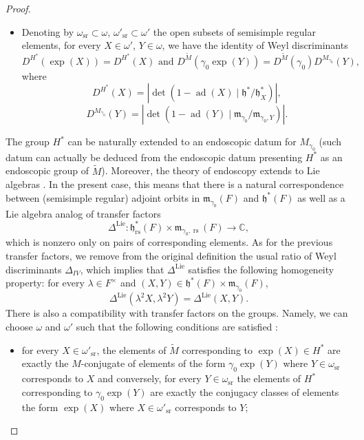 \documentclass[12pt]{article}
\numberwithin{equation}{section}
\def\tM{\widetilde{M}}
\DeclareMathOperator{\ad}{ad}
\DeclareMathOperator{\Lie}{Lie}
\DeclareMathOperator{\rs}{rs}
\DeclareMathOperator{\sr}{sr}
\begin{document}
\begin{proof}
\begin{itemize}
			\item Denoting by $\omega_{\sr}\subset \omega$, $\omega'_{\sr}\subset \omega'$ the open subsets of semisimple regular elements, for every $X\in \omega'$, $Y\in \omega$, we have the identity of Weyl discriminants
			\begin{equation}\label{eq Weyl disc}
				\displaystyle D^{H^*}(\exp(X))=D^{H^*}(X) \mbox{ and } D^{\tM}(\gamma_0 \exp(Y))=D^{\tM}(\gamma_0) D^{M_{\gamma_0}}(Y),
			\end{equation}
			where
		$$\displaystyle D^{H^*}(X)=\left\lvert \det(1-\ad(X)\mid \mathfrak{h}^*/\mathfrak{h}^*_X)\right\rvert,$$
		$$\displaystyle D^{M_{\gamma_0}}(Y)=\left\lvert \det(1-\ad(Y)\mid \mathfrak{m}_{\gamma_0}/\mathfrak{m}_{\gamma_0,Y})\right\rvert.$$
		\end{itemize}
		
		The group $H^*$ can be naturally extended to an endoscopic datum for $M_{\gamma_0}$ (such datum can actually be deduced from the endoscopic datum presenting $H^*$ as an endoscopic group of $\tM$). Moreover, the theory of endoscopy extends to Lie algebras \cite[\S 2]{WaldLFimptrans}. In the present case, this means that there is a natural correspondence between (semisimple regular) adjoint orbits in $\mathfrak{m}_{\gamma_0}(F)$ and $\mathfrak{h}^*(F)$ as well as a Lie algebra analog of transfer factors
		$$\displaystyle \Delta^{\Lie}: \mathfrak{h}^*_{\rs}(F)\times \mathfrak{m}_{\gamma_0,\rs}(F)\to \mathbb{C},$$
		which is nonzero only on pairs of corresponding elements. As for the previous transfer factors, we remove from the original definition the usual ratio of Weyl discriminants $\Delta_{IV}$, which implies that $\Delta^{\Lie}$ satisfies the following homogeneity property: for every $\lambda\in F^\times$ and $(X,Y)\in \mathfrak{h}^*(F)\times \mathfrak{m}_{\gamma_0}(F)$,
		\begin{equation}\label{homog transf factors}
			\Delta^{\Lie}(\lambda^2 X,\lambda^2 Y)=\Delta^{\Lie}(X,Y).
		\end{equation}
There is also a compatibility with transfer factors on the groups. Namely, we can choose $\omega$ and $\omega'$ such that the following conditions are satisfied \cite[lemme 3.8, th�or�me 3.9]{Waldendtordue}:
		\begin{itemize}
			\item for every $X\in \omega'_{\sr}$, the elements of $\tM$ corresponding to $\exp(X)\in H^*$ are exactly the $M$-conjugate of elements of the form $\gamma_0\exp(Y)$ where $Y\in \omega_{\sr}$ corresponds to $X$ and conversely, for every $Y\in \omega_{\sr}$ the elements of $H^*$ corresponding to $\gamma_0 \exp(Y)$ are exactly the conjugacy classes of elements the form $\exp(X)$ where $X\in \omega'_{\sr}$ corresponds to $Y$;
			

\end{itemize}
\end{proof}
\end{document}
